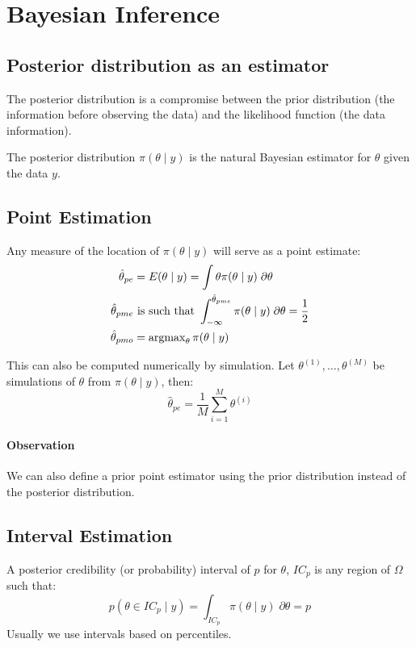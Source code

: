 
\section{Bayesian Inference}

\subsection{Posterior distribution as an estimator}

The posterior distribution is a compromise between the prior
distribution (the information before observing the data) and the
likelihood function (the data information).

The posterior distribution $\pi(\theta \mid y)$ is the natural
Bayesian estimator for $\theta$ given the data $y$.

\subsection{Point Estimation}
Any measure of the location of $\pi(\theta \mid y)$ will serve as a point
estimate:
\begin{align*}
    \hat{\theta}_{pe} &= E(\theta \mid y) = \int \theta \pi(\theta \mid y) \;\partial\theta \\
    \hat{\theta}_{pme} &\text{ is such that } \int_{-\infty}^{\hat{\theta}_{pme}} \pi(\theta \mid y) \;\partial\theta = \frac{1}{2} \\
    \hat{\theta}_{pmo} &= \operatorname{argmax}_{\theta} \pi(\theta \mid y) \\
\end{align*}

This can also be computed numerically by simulation. Let $\theta^{(1)}, \dots , \theta^{(M)}$ be
simulations of $\theta$ from $\pi(\theta \mid y)$, then:
\begin{equation}
    \hat{\theta}_{pe} = \frac{1}{M} \sum_{i=1}^M \theta^{(i)}
\end{equation}

\paragraph{Observation} We can also define a prior point estimator using the prior distribution
instead of the posterior distribution.

\subsection{Interval Estimation}
A posterior credibility (or probability) interval of $p$ for $\theta$, $IC_p$ is
any region of $\Omega$ such that:
\begin{equation}
    p(\theta \in IC_p \mid y) = \int_{IC_p} \pi(\theta \mid y) \;\partial\theta = p
\end{equation}
Usually we use intervals based on percentiles.

